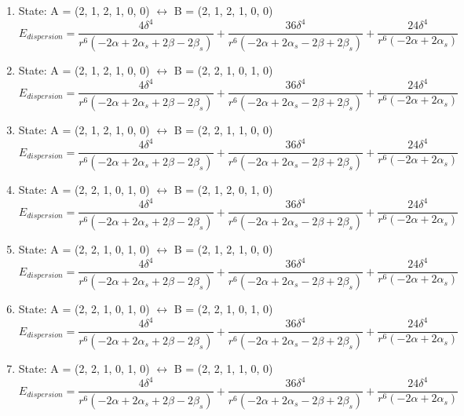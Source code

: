 \documentclass[12pt,a4paper]{article}
\begin{document}
\begin{enumerate}
 \item State: A = (2, 1, 2, 1, 0, 0) $\leftrightarrow$ B = (2, 1, 2, 1, 0, 0) 
$$E_{dispersion} =\frac{4 \delta^{4}}{r^{6} \left(- 2 \alpha + 2 \alpha_{s} + 2 \beta - 2 \beta_{s}\right)} + \frac{36 \delta^{4}}{r^{6} \left(- 2 \alpha + 2 \alpha_{s} - 2 \beta + 2 \beta_{s}\right)} + \frac{24 \delta^{4}}{r^{6} \left(- 2 \alpha + 2 \alpha_{s}\right)}$$
 \item State: A = (2, 1, 2, 1, 0, 0) $\leftrightarrow$ B = (2, 2, 1, 0, 1, 0) 
$$E_{dispersion} =\frac{4 \delta^{4}}{r^{6} \left(- 2 \alpha + 2 \alpha_{s} + 2 \beta - 2 \beta_{s}\right)} + \frac{36 \delta^{4}}{r^{6} \left(- 2 \alpha + 2 \alpha_{s} - 2 \beta + 2 \beta_{s}\right)} + \frac{24 \delta^{4}}{r^{6} \left(- 2 \alpha + 2 \alpha_{s}\right)}$$
 \item State: A = (2, 1, 2, 1, 0, 0) $\leftrightarrow$ B = (2, 2, 1, 1, 0, 0) 
$$E_{dispersion} =\frac{4 \delta^{4}}{r^{6} \left(- 2 \alpha + 2 \alpha_{s} + 2 \beta - 2 \beta_{s}\right)} + \frac{36 \delta^{4}}{r^{6} \left(- 2 \alpha + 2 \alpha_{s} - 2 \beta + 2 \beta_{s}\right)} + \frac{24 \delta^{4}}{r^{6} \left(- 2 \alpha + 2 \alpha_{s}\right)}$$
 \item State: A = (2, 2, 1, 0, 1, 0) $\leftrightarrow$ B = (2, 1, 2, 0, 1, 0) 
$$E_{dispersion} =\frac{4 \delta^{4}}{r^{6} \left(- 2 \alpha + 2 \alpha_{s} + 2 \beta - 2 \beta_{s}\right)} + \frac{36 \delta^{4}}{r^{6} \left(- 2 \alpha + 2 \alpha_{s} - 2 \beta + 2 \beta_{s}\right)} + \frac{24 \delta^{4}}{r^{6} \left(- 2 \alpha + 2 \alpha_{s}\right)}$$
 \item State: A = (2, 2, 1, 0, 1, 0) $\leftrightarrow$ B = (2, 1, 2, 1, 0, 0) 
$$E_{dispersion} =\frac{4 \delta^{4}}{r^{6} \left(- 2 \alpha + 2 \alpha_{s} + 2 \beta - 2 \beta_{s}\right)} + \frac{36 \delta^{4}}{r^{6} \left(- 2 \alpha + 2 \alpha_{s} - 2 \beta + 2 \beta_{s}\right)} + \frac{24 \delta^{4}}{r^{6} \left(- 2 \alpha + 2 \alpha_{s}\right)}$$
 \item State: A = (2, 2, 1, 0, 1, 0) $\leftrightarrow$ B = (2, 2, 1, 0, 1, 0) 
$$E_{dispersion} =\frac{4 \delta^{4}}{r^{6} \left(- 2 \alpha + 2 \alpha_{s} + 2 \beta - 2 \beta_{s}\right)} + \frac{36 \delta^{4}}{r^{6} \left(- 2 \alpha + 2 \alpha_{s} - 2 \beta + 2 \beta_{s}\right)} + \frac{24 \delta^{4}}{r^{6} \left(- 2 \alpha + 2 \alpha_{s}\right)}$$
 \item State: A = (2, 2, 1, 0, 1, 0) $\leftrightarrow$ B = (2, 2, 1, 1, 0, 0) 
$$E_{dispersion} =\frac{4 \delta^{4}}{r^{6} \left(- 2 \alpha + 2 \alpha_{s} + 2 \beta - 2 \beta_{s}\right)} + \frac{36 \delta^{4}}{r^{6} \left(- 2 \alpha + 2 \alpha_{s} - 2 \beta + 2 \beta_{s}\right)} + \frac{24 \delta^{4}}{r^{6} \left(- 2 \alpha + 2 \alpha_{s}\right)}$$

\end{enumerate}
\end{document}
